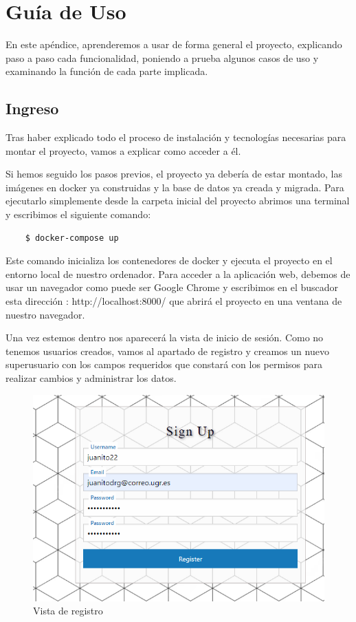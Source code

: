 \appendix 

\chapter{Guía de Uso}

En este apéndice, aprenderemos a usar de forma general el proyecto, explicando paso a paso cada funcionalidad, poniendo a prueba algunos casos de uso y examinando la función de cada parte implicada.

\section{Ingreso}

Tras haber explicado todo el proceso de instalación y tecnologías necesarias para montar el proyecto, vamos a explicar como acceder a él. 

Si hemos seguido los pasos previos, el proyecto ya debería de estar montado, las imágenes en docker ya construidas y la base de datos ya creada y migrada. Para ejecutarlo simplemente desde la carpeta inicial del proyecto abrimos una terminal y escribimos el siguiente comando:

\begin{verbatim} 
    $ docker-compose up
\end{verbatim}

Este comando inicializa los contenedores de docker y ejecuta el proyecto en el entorno local de nuestro ordenador. Para acceder a la aplicación web, debemos de usar un navegador como puede ser Google Chrome y escribimos en el buscador esta dirección : http://localhost:8000/ que abrirá el proyecto en una ventana de nuestro navegador.

Una vez estemos dentro nos aparecerá la vista de inicio de sesión. Como no tenemos usuarios creados, vamos al apartado de registro y creamos un nuevo superusuario con los campos requeridos que constará con los permisos para realizar cambios y administrar los datos. \vspace{1cm}

\begin{figure}[!ht]
    \centering
    \includegraphics[width=1\textwidth]{imagenes/registro_a.png}
    \caption{ Vista de registro }
    \label{fig:planificacion}
\end{figure}\vspace{0.5cm}

